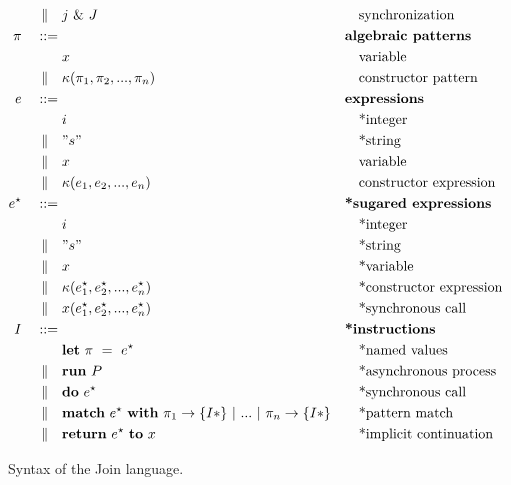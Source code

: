 \begin{figure}
\begin{align*}
\mid\kern-1pt\mid\quad& j ~\&~ J
                           && \quad\textrm{synchronization} \\
\pi\quad ::={}&            && \textbf{algebraic patterns} \\
         & x               && \quad\textrm{variable} \\
\mid\kern-1pt\mid\quad& \kappa(\pi_1, \pi_2, ..., \pi_n)
                           && \quad\textrm{constructor pattern} \\
e\quad ::={}&              && \textbf{expressions} \\
         & i               && \quad\textrm{*integer} \\
\mid\kern-1pt\mid\quad& " s "         && \quad\textrm{*string} \\
\mid\kern-1pt\mid\quad& x               && \quad\textrm{variable} \\
\mid\kern-1pt\mid\quad& \kappa(e_1, e_2, ..., e_n)
                           && \quad\textrm{constructor expression} \\
e^\star\quad ::={}&         && \textbf{*sugared expressions} \\
         & i               && \quad\textrm{*integer} \\
\mid\kern-1pt\mid\quad& " s "         && \quad\textrm{*string} \\
\mid\kern-1pt\mid\quad& x               && \quad\textrm{*variable} \\
\mid\kern-1pt\mid\quad& \kappa(e^\star_1, e^\star_2, ..., e^\star_n)
                           && \quad\textrm{*constructor expression} \\
\mid\kern-1pt\mid\quad& x(e^\star_1, e^\star_2, ..., e^\star_ n)
                           && \quad\textrm{*synchronous call} \\
I\quad ::={}&              && \textbf{*instructions} \\
         & \mathbf{let}~\pi~=~e^\star
                           && \quad\textrm{*named values} \\
\mid\kern-1pt\mid\quad& \mathbf{run}~P  && \quad\textrm{*asynchronous process} \\
\mid\kern-1pt\mid\quad& \mathbf{do}~e^\star && \quad\textrm{*synchronous call} \\
\mid\kern-1pt\mid\quad& \textbf{match}~e^\star~\textbf{with}~\pi_1
               \rightarrow \{ I* \} ~|~ ... ~|~ \pi_n \rightarrow \{ I* \}
                           && \quad\textrm{*pattern match} \\
\mid\kern-1pt\mid\quad& \textbf{return}~e^\star~\textbf{to}~x
                           && \quad\textrm{*implicit continuation}
\end{align*}
\caption{Syntax of the Join language.\label{fig:syntax}}
\end{figure}


